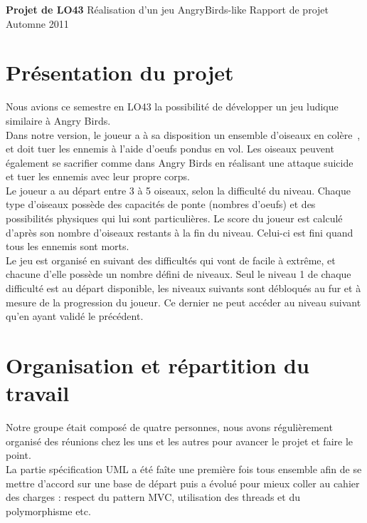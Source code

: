 \documentclass[a4paper,12pt]{report}
\begin{document}
{\textbf{Projet de LO43}} %
{Réalisation d'un jeu AngryBirds-like} %
{Rapport de projet} %
{Automne 2011} %
{} %
{} %

\tableofcontents
\chapter{Présentation du projet}
Nous avions ce semestre en LO43 la possibilité de développer un jeu ludique similaire à Angry Birds.\\

Dans notre version, le joueur a à sa disposition un ensemble d'oiseaux \guillemotleft en colère\guillemotright~,
et doit tuer les ennemis à l'aide d'oeufs pondus en vol. Les oiseaux peuvent également se sacrifier comme dans Angry Birds
en réalisant une \guillemotleft attaque suicide\guillemotright~ et tuer les ennemis avec leur propre corps.\\

Le joueur a au départ entre 3 à 5 oiseaux, selon la difficulté du niveau. Chaque type d'oiseaux possède des 
capacités de ponte (nombres d'oeufs) et des possibilités physiques qui lui sont particulières. Le score du joueur est calculé d'après
son nombre d'oiseaux restants à la fin du niveau. Celui-ci est fini quand tous les ennemis sont morts.\\

Le jeu est organisé en suivant des difficultés qui vont de facile à extrême, et 
chacune d'elle possède un nombre défini de niveaux.
Seul le niveau 1 de chaque difficulté est au départ disponible, les niveaux 
suivants sont débloqués au fur et à mesure de la progression du joueur. 
Ce dernier ne peut accéder au niveau suivant qu'en ayant validé le précédent.\\
 

\chapter{Organisation et répartition du travail}
Notre groupe était composé de quatre personnes, nous avons régulièrement organisé 
des réunions chez les uns et les autres pour avancer le projet et faire le point.\\

La partie spécification UML a été faîte une première fois tous ensemble afin de se
mettre d'accord sur une base de départ puis a évolué pour mieux coller au cahier des
charges : respect du pattern MVC, utilisation des threads et du polymorphisme etc.\\
\end{document}
